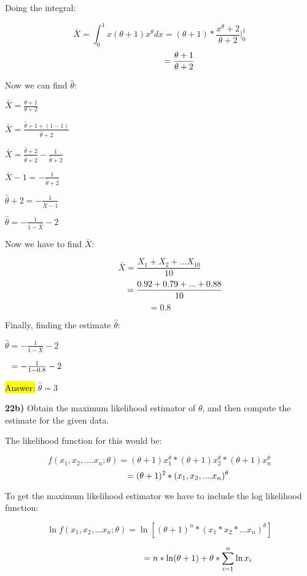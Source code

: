 \documentclass{article}
\begin{document}
Doing the integral:

$$\bar{X}=\int_{0}^{1}x(\theta+1)x^{\theta}dx=(\theta+1)*\frac{x^\theta + 2}{\theta +2}|_{0}^{1}$$
$$\hspace{.65in}=\frac{\theta +1}{\theta + 2}$$

Now we can find $\hat{\theta}$:
\vspace{2mm}

$\bar{X}=\frac{\theta +1}{\theta + 2}$

$\bar{X}=\frac{\hat{\theta} +1 + (1 - 1)}{\hat{\theta} + 2}$

$\bar{X}=\frac{\hat{\theta} +2}{\hat{\theta} + 2}-\frac{1}{\hat{\theta} + 2}$

$\bar{X}-1=-\frac{1}{\hat{\theta} +2}$

$\hat{\theta}+2=-\frac{1}{\bar{X}-1}$

$\hat{\theta}=-\frac{1}{1-\bar{X}}-2$
\vspace{2mm}

Now we have to find $\bar{X}$:

$$\bar{X}=\frac{X_{1}+X_{2}+...X_{10}}{10}$$
$$\hspace{.5in}=\frac{0.92+0.79+...+0.88}{10}$$
$$=0.8$$

Finally, finding the estimate $\hat{\theta}$:

\vspace{2mm}
$\hat{\theta}=-\frac{1}{1-\bar{X}}-2$

$\hspace{.1in}=-\frac{1}{1-0.8}-2$

\hl{Answer:} $\hat{\theta}=3$
\newpage

\vspace{3mm}
\textbf{22b)} Obtain the maximum likelihood estimator of $\theta$, and then compute the estimate for the given data. 

The likelihood function for this would be:

$$f(x_{1}, x_{2},....x_{n}; \theta)= (\theta + 1)x_{1}^{\theta} * (\theta + 1)x_{2}^{\theta}* (\theta + 1)x_{n}^{\theta}$$
$$\hspace{.6in}=(\theta +1)^{2} * (x_{1}, x_{2},....x_{n})^{\theta}$$

To get the maximum likelihood estimator we have to include the log likelihood function:

$$\ln f(x_{1}, x_{2},... x_{n}; \theta)= \ln[(\theta+1)^{n} * (x_{1} *x_{2}*...x_{n})^{\theta}]$$

$$\hspace{1.25 in}=n*\ln(\theta+1)+\theta * \sum_{i=1}^{n}  \ln  x_{i}$$
\end{document}

